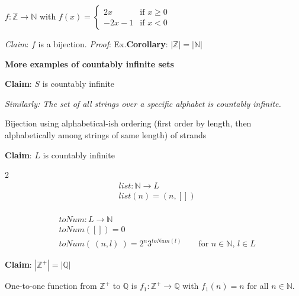 \documentclass[12pt, oneside]{article}
\begin{document}
$f: \mathbb{Z} \to \mathbb{N}$ with $f(x) = \begin{cases}2x &\text{if $x \geq 0$} \\-2x-1 &\text{if $x < 0$} \end{cases}$

{\it Claim}: $f$ is a bijection.  {\it Proof}: Ex.\hfill {\bf Corollary}: $ | \mathbb{Z} | = |\mathbb{N}|$
\newpage


 

{\bf More examples of countably infinite sets}

{\bf Claim}: $S$ is countably infinite

{\it Similarly: The set of all strings over a specific alphabet is countably infinite.}
\begin{center}
Bijection using alphabetical-ish ordering
(first order by length, then alphabetically among strings of same length) 
of strands
\end{center}

\vspace{50pt}


{\bf Claim}: $L$ is countably infinite

\begin{multicols}{2}
\begin{align*}
    &list: \mathbb{N} \to L \\
    &list(n) = (n, []) \\
    &
\end{align*}

\begin{align*}
    &toNum: L \to \mathbb{N} \\
    &toNum([]) = 0 \\
    &toNum( ~(n,l)~) = 2^n 3^{toNum(l)} \qquad \text{for $n \in \mathbb{N}$, $l \in L$}
\end{align*}
\end{multicols}
\vspace{30pt}

{\bf Claim}: $|\mathbb{Z}^+| = |\mathbb{Q}|$ 

One-to-one function from $\mathbb{Z}^+$ to $\mathbb{Q}$
is $f_1: \mathbb{Z}^+ \to \mathbb{Q}$ with $f_1(n) = n$ for all 
$n \in \mathbb{N}$.

\vspace{30pt}
\end{document}
